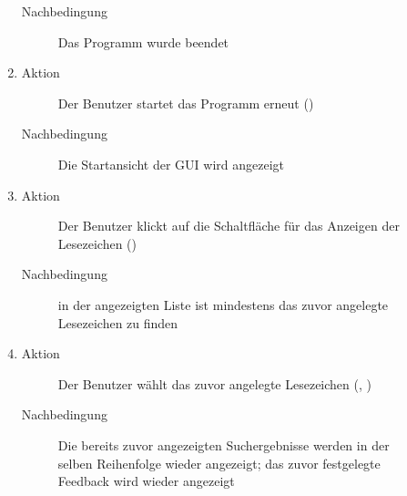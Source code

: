 \begin{description}
\begin{enumerate}
\begin{description}
			\item[Nachbedingung] Das Programm wurde beendet
		\end{description}
		\item
		\begin{description}
			\item[Aktion] Der Benutzer startet das Programm erneut ()
			\item[Nachbedingung] Die Startansicht der GUI wird angezeigt
		\end{description}
		\item
		\begin{description}
			\item[Aktion] Der Benutzer klickt auf die Schaltfläche für das Anzeigen der Lesezeichen ()
			\item[Nachbedingung] in der angezeigten Liste ist mindestens das zuvor angelegte Lesezeichen zu finden
		\end{description}
		\item
		\begin{description}
			\item[Aktion] Der Benutzer wählt das zuvor angelegte Lesezeichen (, )
			\item[Nachbedingung] Die bereits zuvor angezeigten Suchergebnisse werden in der selben Reihenfolge wieder angezeigt; das zuvor festgelegte Feedback wird wieder angezeigt
		\end{description}
	\end{enumerate}


\end{description}
